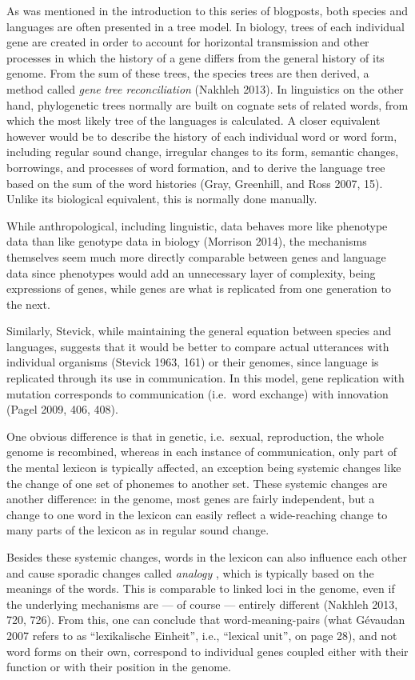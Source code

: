 \documentclass[
  a4paper,
  14pt,
  oneside,
  tablecaptionabove
]{scrbook}
\begin{document}
As was mentioned in the introduction to this series of blogposts, both
species and languages are often presented in a tree model. In biology,
trees of each individual gene are created in order to account for
horizontal transmission and other processes in which the history of a
gene differs from the general history of its genome. From the sum of
these trees, the species trees are then derived, a method called
\emph{gene} \emph{tree reconciliation} (Nakhleh 2013). In linguistics on
the other hand, phylogenetic trees normally are built on cognate sets of
related words, from which the most likely tree of the languages is
calculated. A closer equivalent however would be to describe the history
of each individual word or word form, including regular sound change,
irregular changes to its form, semantic changes, borrowings, and
processes of word formation, and to derive the language tree based on
the sum of the word histories (Gray, Greenhill, and Ross 2007, 15).
Unlike its biological equivalent, this is normally done manually.

While anthropological, including linguistic, data behaves more like
phenotype data than like genotype data in biology (Morrison 2014), the
mechanisms themselves seem much more directly comparable between genes
and language data since phenotypes would add an unnecessary layer of
complexity, being expressions of genes, while genes are what is
replicated from one generation to the next.

Similarly, Stevick, while maintaining the general equation between
species and languages, suggests that it would be better to compare
actual utterances with individual organisms (Stevick 1963, 161) or their
genomes, since language is replicated through its use in communication.
In this model, gene replication with mutation corresponds to
communication (i.e.~word exchange) with innovation (Pagel 2009, 406,
408).

One obvious difference is that in genetic, i.e.~sexual, reproduction,
the whole genome is recombined, whereas in each instance of
communication, only part of the mental lexicon is typically affected, an
exception being systemic changes like the change of one set of phonemes
to another set. These systemic changes are another difference: in the
genome, most genes are fairly independent, but a change to one word in
the lexicon can easily reflect a wide-reaching change to many parts of
the lexicon as in regular sound change.

Besides these systemic changes, words in the lexicon can also influence
each other and cause sporadic changes called \emph{analogy} , which is
typically based on the meanings of the words. This is comparable to
linked loci in the genome, even if the underlying mechanisms are ­­---
of course --- entirely different (Nakhleh 2013, 720, 726). From this,
one can conclude that word-meaning-pairs (what Gévaudan 2007 refers to
as \enquote{lexikalische Einheit}, i.e., \enquote{lexical unit}, on page
28), and not word forms on their own, correspond to individual genes
coupled either with their function or with their position in the genome.
\end{document}
